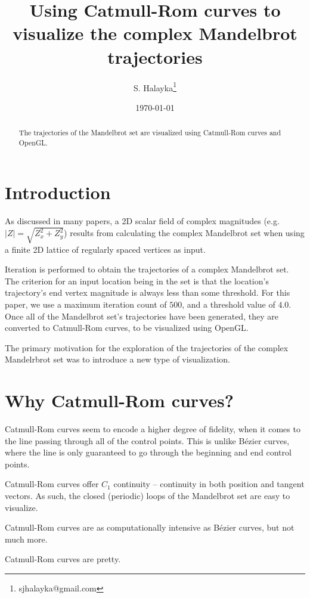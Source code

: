 \documentclass[12pt]{article}
\title{Using Catmull-Rom curves to visualize the complex Mandelbrot trajectories}
\author{S. Halayka\footnote{sjhalayka@gmail.com}}
\date{\today}
\begin{document}
\maketitle

\begin{abstract}
The trajectories of the Mandelbrot set are visualized using Catmull-Rom curves and OpenGL.
\end{abstract}



\section{Introduction}

As discussed in many papers, a 2D scalar field of complex magnitudes (e.g. $|Z| = \sqrt{Z_x^2 + Z_y^2}$) results from calculating the complex Mandelbrot set when using a finite 2D lattice of regularly spaced vertices as input.

Iteration is performed to obtain the trajectories of a complex Mandelbrot set.
The criterion for an input location being in the set is that the location's trajectory's end vertex magnitude is always less than some threshold.
For this paper, we use a maximum iteration count of $500$, and a threshold value of $4.0$.
Once all of the Mandelbrot set's trajectories have been generated, they are converted to Catmull-Rom curves, to be visualized using OpenGL. 

The primary motivation for the exploration of the trajectories of the complex Mandelrbrot set was to introduce a new type of visualization.


\section{Why Catmull-Rom curves?}

Catmull-Rom curves seem to encode a higher degree of fidelity, when it comes to the line passing through all of the control points.
This is unlike B\'ezier curves, where the line is only guaranteed to go through the beginning and end control points.

Catmull-Rom curves offer $C_1$ continuity -- continuity in both position and tangent vectors.
As such, the closed (periodic) loops of the Mandelbrot set are easy to visualize.

Catmull-Rom curves are as computationally intensive as B\'ezier curves, but not much more.

Catmull-Rom curves are pretty.
\end{document}
